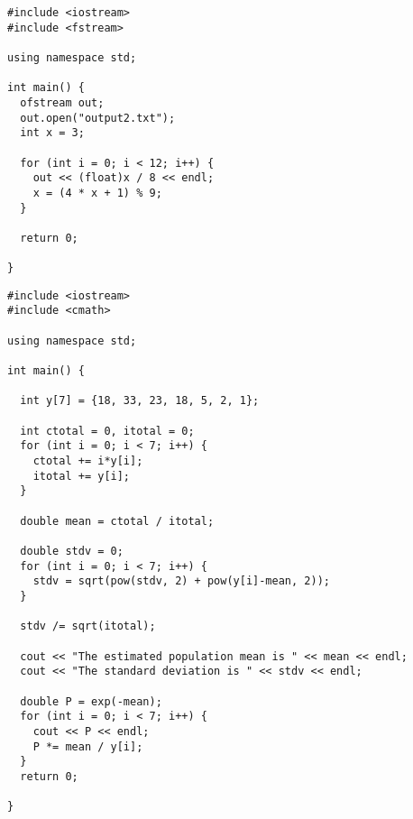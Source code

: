 \documentclass{article}
\begin{document}
\begin{verbatim}
#include <iostream>
#include <fstream>

using namespace std;

int main() {
  ofstream out;
  out.open("output2.txt");
  int x = 3;

  for (int i = 0; i < 12; i++) {
    out << (float)x / 8 << endl;
    x = (4 * x + 1) % 9;
  }

  return 0;

}

\end{verbatim}

\begin{verbatim}
#include <iostream>
#include <cmath>

using namespace std;

int main() {

  int y[7] = {18, 33, 23, 18, 5, 2, 1};

  int ctotal = 0, itotal = 0;
  for (int i = 0; i < 7; i++) {
    ctotal += i*y[i];
    itotal += y[i];
  }

  double mean = ctotal / itotal;

  double stdv = 0;
  for (int i = 0; i < 7; i++) {
    stdv = sqrt(pow(stdv, 2) + pow(y[i]-mean, 2));
  }

  stdv /= sqrt(itotal);

  cout << "The estimated population mean is " << mean << endl;
  cout << "The standard deviation is " << stdv << endl;

  double P = exp(-mean);
  for (int i = 0; i < 7; i++) {
    cout << P << endl;
    P *= mean / y[i];
  }
  return 0;

}

\end{verbatim}
\end{document}

